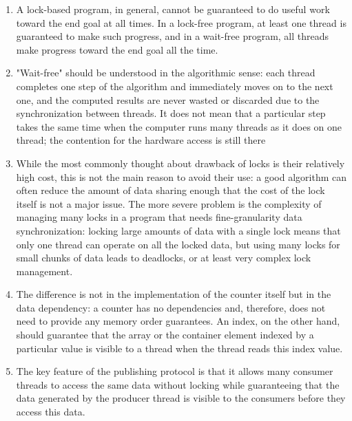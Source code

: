 \begin{enumerate}
\item 
A lock-based program, in general, cannot be guaranteed to do useful work toward the end goal at all times. In a lock-free program, at least one thread is guaranteed to make such progress, and in a wait-free program, all threads make progress toward the end goal all the time.

\item 
"Wait-free" should be understood in the algorithmic sense: each thread completes one step of the algorithm and immediately moves on to the next one, and the computed results are never wasted or discarded due to the synchronization between threads. It does not mean that a particular step takes the same time when the computer runs many threads as it does on one thread; the contention for the hardware access is still there

\item 
While the most commonly thought about drawback of locks is their relatively high cost, this is not the main reason to avoid their use: a good algorithm can often reduce the amount of data sharing enough that the cost of the lock itself is not a major issue. The more severe problem is the complexity of managing many locks in a program that needs fine-granularity data synchronization: locking large amounts of data with a single lock means that only one thread can operate on all the locked data, but using many locks for small chunks of data leads to deadlocks, or at least very complex lock management.

\item
The difference is not in the implementation of the counter itself but in the data dependency: a counter has no dependencies and, therefore, does not need to provide any memory order guarantees. An index, on the other hand, should guarantee that the array or the container element indexed by a particular value is visible to a thread when the thread reads this index value.

\item
The key feature of the publishing protocol is that it allows many consumer threads to access the same data without locking while guaranteeing that the data generated by the producer thread is visible to the consumers before they access this data.

\end{enumerate}